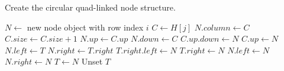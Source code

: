 \begin{algorithm}[H]
	\caption{Create the circular quad-linked node structure.}
	\label{alg:nodes}
	\begin{distribalgo}[1]
				\STATE $N \leftarrow$ new node object with row index $i$
				\STATE $C \leftarrow H[j]$
				\STATE $N.column \leftarrow C$
				\STATE $C.size \leftarrow C.size + 1$  
				\STATE $N.up \leftarrow C.up$  
				\STATE $N.down \leftarrow C$
				\STATE $C.up.down \leftarrow N$
				\STATE $C.up \leftarrow N$
					\STATE $N.left \leftarrow T$  
					\STATE $N.right \leftarrow T.right$
					\STATE $T.right.left \leftarrow N$
					\STATE $T.right \leftarrow N$
				\ELSE
					\STATE $N.left \leftarrow N$  
					\STATE $N.right \leftarrow N$
				\ENDIF
				\STATE $T \leftarrow N$
			\ENDFOR
			\STATE Unset $T$
		\ENDFOR
	\end{distribalgo}
\end{algorithm}


